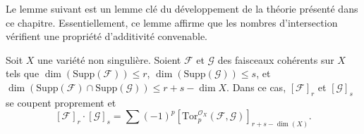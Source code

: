 \noindent
Le lemme suivant est un lemme clé du développement de la théorie
présenté dans ce chapitre. Essentiellement, ce lemme affirme que
les nombres d'intersection vérifient une propriété d'additivité convenable.

\begin{lemma}
\label{lemma-tor-sheaf}
\begin{reference}
\cite[chapitre V]{Serre_algebre_locale}
\end{reference}
Soit $X$ une variété non singulière. Soient $\mathcal{F}$ et
$\mathcal{G}$ des faisceaux cohérents sur $X$ tels que
$\dim(\text{Supp}(\mathcal{F})) \leq r$,
$\dim(\text{Supp}(\mathcal{G})) \leq s$, et
$\dim(\text{Supp}(\mathcal{F}) \cap \text{Supp}(\mathcal{G}) )
\leq r + s - \dim X$. Dans ce cas, $[\mathcal{F}]_r$ et $[\mathcal{G}]_s$
se coupent proprement et
$$
[\mathcal{F}]_r \cdot [\mathcal{G}]_s =
\sum (-1)^p
[\text{Tor}_p^{\mathcal{O}_X}(\mathcal{F}, \mathcal{G})]_{r + s - \dim(X)}.
$$
\end{lemma}

